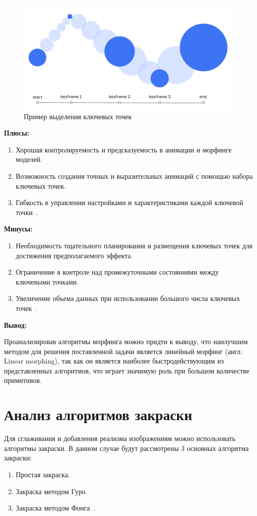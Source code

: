 \begin{figure}[H]
	\centering
	\includegraphics[scale=0.4]{images/key_frames.png}
	\caption{Пример выделения ключевых точек}
	\label{fig:key_frames}
\end{figure}


\textbf{Плюсы:}
\begin{enumerate}
	\item Хорошая контролируемость и предсказуемость в анимации и морфинге моделей.
	\item Возможность создания точных и выразительных анимаций с помощью набора ключевых точек.
	\item Гибкость в управлении настройками и характеристиками каждой ключевой точки~\cite{morphing_methods}.
\end{enumerate}

\textbf{Минусы:}
\begin{enumerate}
	\item Необходимость тщательного планирования и размещения ключевых точек для достижения предполагаемого эффекта.
	\item Ограничение в контроле над промежуточными состояниями между ключевыми точками.
	\item Увеличение объема данных при использовании большого числа ключевых точек~\cite{morphing_methods}.
\end{enumerate}

\textbf{Вывод:}

Проанализировав алгоритмы морфинга можно придти к выводу, что наилучшим методом для решения поставленной задачи является
линейный морфинг (англ. Linear morphing), так как он является наиболее быстродействующим из представленных алгоритмов, что играет значимую роль при большом количестве примитивов.


\section{Анализ алгоритмов закраски}
\label{sec:draw_algo_analysis}
Для сглаживания и добавления реализма изображениям можно использовать алгоритмы закраски.
В данном случае будут рассмотрены 3 основных алгоритма закраски:
\begin{enumerate}
	\item Простая закраска.
	\item Закраска методом Гуро.
	\item Закраска методом Фонга~\cite{draw_methods}.
\end{enumerate}


